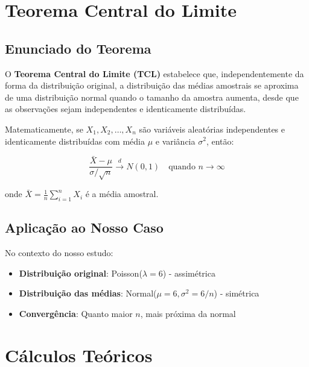 \documentclass[12pt,a4paper]{article}
\begin{document}
\section{Teorema Central do Limite}

\subsection{Enunciado do Teorema}

\begin{definicao}
O \textbf{Teorema Central do Limite (TCL)} estabelece que, independentemente da forma da distribuição original, a distribuição das médias amostrais se aproxima de uma distribuição normal quando o tamanho da amostra aumenta, desde que as observações sejam independentes e identicamente distribuídas.
\end{definicao}

Matematicamente, se $X_1, X_2, \ldots, X_n$ são variáveis aleatórias independentes e identicamente distribuídas com média $\mu$ e variância $\sigma^2$, então:

\begin{equation}
\frac{\bar{X} - \mu}{\sigma/\sqrt{n}} \xrightarrow{d} N(0,1) \quad \text{quando } n \to \infty
\end{equation}

onde $\bar{X} = \frac{1}{n}\sum_{i=1}^{n} X_i$ é a média amostral.

\subsection{Aplicação ao Nosso Caso}

No contexto do nosso estudo:
\begin{itemize}
    \item \textbf{Distribuição original}: Poisson($\lambda = 6$) - assimétrica
    \item \textbf{Distribuição das médias}: Normal($\mu = 6, \sigma^2 = 6/n$) - simétrica
    \item \textbf{Convergência}: Quanto maior $n$, mais próxima da normal
\end{itemize}

\section{Cálculos Teóricos}
\end{document}
